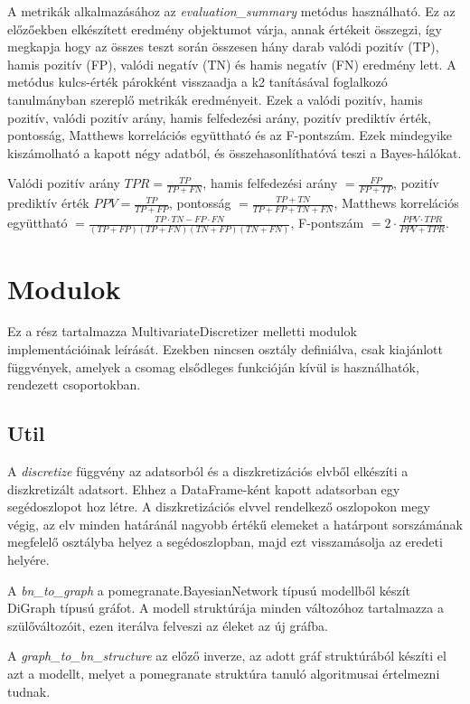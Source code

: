 A metrikák alkalmazásához az \emph{evaluation\_summary} metódus használható. Ez az előzőekben elkészített eredmény objektumot várja, annak értékeit összegzi, így megkapja hogy az összes teszt során összesen hány darab valódi pozitív (TP), hamis pozitív (FP), valódi negatív (TN) és hamis negatív (FN) eredmény lett. A metódus kulcs-érték párokként visszaadja a k2 tanításával foglalkozó tanulmányban \cite{aghdam2019some} szereplő metrikák eredményeit. Ezek a valódi pozitív, hamis pozitív, valódi pozitív arány, hamis felfedezési arány, pozitív prediktív érték, pontosság, Matthews korrelációs együttható és az F-pontszám. Ezek mindegyike kiszámolható a kapott négy adatból, és összehasonlíthatóvá teszi a Bayes-hálókat.

Valódi pozitív arány $TPR = \frac{TP}{TP + FN}$, hamis felfedezési arány $= \frac{FP}{FP + TP}$,
pozitív prediktív érték $PPV = \frac{TP}{TP+FP}$, pontosság $= \frac{TP + TN}{TP + FP + TN + FN}$,
Matthews korrelációs együttható $= \frac{TP \cdot TN-FP \cdot FN}{(TP + FP)(TP + FN)(TN + FP)(TN + FN)}$,
F-pontszám $= 2 \cdot \frac{PPV \cdot TPR}{PPV + TPR}$.


\section{Modulok}
Ez a rész tartalmazza MultivariateDiscretizer melletti modulok implementációinak leírását. Ezekben nincsen osztály definiálva, csak kiajánlott függvények, amelyek a csomag elsődleges funkcióján kívül is használhatók, rendezett csoportokban.

\subsection{Util}
A \emph{discretize} függvény az adatsorból és a diszkretizációs elvből elkészíti a diszkretizált adatsort. Ehhez a DataFrame-ként kapott adatsorban egy segédoszlopot hoz létre. A diszkretizációs elvvel rendelkező oszlopokon megy végig, az elv minden határánál nagyobb értékű elemeket a határpont sorszámának megfelelő osztályba helyez a segédoszlopban, majd ezt visszamásolja az eredeti helyére.

A \emph{bn\_to\_graph} a pomegranate.BayesianNetwork típusú modellből készít DiGraph típusú gráfot. A modell struktúrája minden változóhoz tartalmazza a szülőváltozóit, ezen iterálva felveszi az éleket az új gráfba.

A \emph{graph\_to\_bn\_structure} az előző inverze, az adott gráf struktúrából készíti el azt a modellt, melyet a pomegranate struktúra tanuló algoritmusai értelmezni tudnak.

